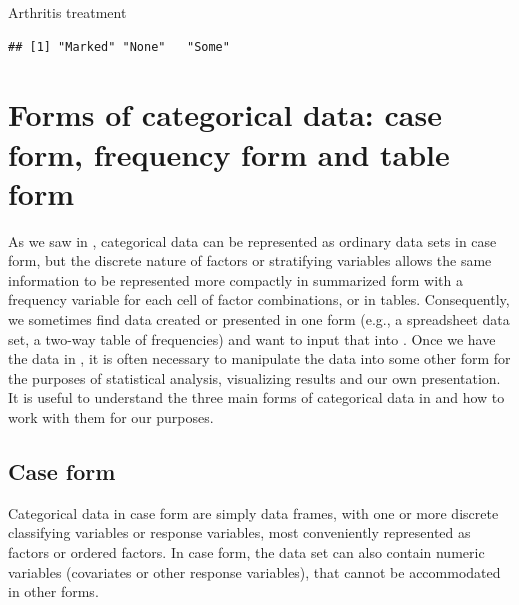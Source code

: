 \documentclass[11pt]{book}
\renewenvironment{knitrout}{\small\renewcommand{\baselinestretch}{.85}}{} %
\begin{document}
\begin{Example}{Arthritis treatment}
\begin{knitrout}
\color{fgcolor}\begin{kframe}
\begin{alltt}
\hlopt{$}
\end{alltt}
\begin{verbatim}
## [1] "Marked" "None"   "Some"
\end{verbatim}
\begin{alltt}
\hlopt{$} \hlkwb{<-} \hlopt{$}
                              \hlstd{=}\hlstd{(}\hlstd{,} \hlstd{,} \hlstd{))}
\end{alltt}
\end{kframe}
\end{knitrout}

\end{Example}

\section{Forms of categorical data: case form, frequency form and table form}\label{sec:forms}
As we saw in , categorical data can be represented as ordinary data sets
in case form, but the discrete nature of factors or stratifying variables allows the same
information to be represented more compactly in summarized form with a frequency
variable for each cell of factor combinations, or in tables.  
Consequently, we sometimes 
find data created or presented in one form (e.g., a spreadsheet data set, a two-way
table of frequencies) and want to input that into \R.  Once we have the data in \R,
it is often necessary to manipulate the data into some other form for the purposes
of statistical analysis, visualizing results and our own presentation.
It is useful to understand the three main forms of categorical data in \R and how
to work with them for our purposes.

\subsection{Case form}
Categorical data in case form are simply data frames, with one or more discrete
classifying variables or response variables, most conveniently represented as factors or ordered factors.  In case form, the data set can also contain numeric variables
(covariates or other response variables), that cannot be accommodated in other
forms.
\end{document}

